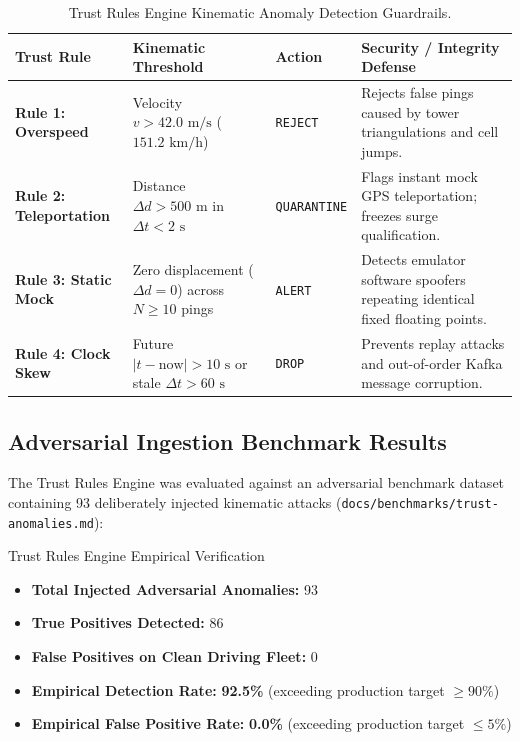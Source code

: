 \documentclass[11pt,a4paper]{article}
\begin{document}
\begin{table}[htbp]
\centering
\small
\begin{tabularx}{\textwidth}{l p{4.0cm} l X}
\toprule
\textbf{Trust Rule} & \textbf{Kinematic Threshold} & \textbf{Action} & \textbf{Security / Integrity Defense} \\
\midrule
\textbf{Rule 1: Overspeed} & Velocity $v > 42.0\text{ m/s}$ ($151.2\text{ km/h}$) & \texttt{REJECT} & Rejects false pings caused by tower triangulations and cell jumps. \\
\rowcolor{HexLightBg}
\textbf{Rule 2: Teleportation} & Distance $\Delta d > 500\text{ m}$ in $\Delta t < 2\text{ s}$ & \texttt{QUARANTINE} & Flags instant mock GPS teleportation; freezes surge qualification. \\
\textbf{Rule 3: Static Mock} & Zero displacement ($\Delta d = 0$) across $N \ge 10$ pings & \texttt{ALERT} & Detects emulator software spoofers repeating identical fixed floating points. \\
\rowcolor{HexLightBg}
\textbf{Rule 4: Clock Skew} & Future $|t - \text{now}| > 10\text{ s}$ or stale $\Delta t > 60\text{ s}$ & \texttt{DROP} & Prevents replay attacks and out-of-order Kafka message corruption. \\
\bottomrule
\end{tabularx}
\caption{Trust Rules Engine Kinematic Anomaly Detection Guardrails.}
\label{tab:trust_rules}
\end{table}

\subsection{Adversarial Ingestion Benchmark Results}
The Trust Rules Engine was evaluated against an adversarial benchmark dataset containing 93 deliberately injected kinematic attacks (\texttt{docs/benchmarks/trust-anomalies.md}):
\begin{metricbox}{Trust Rules Engine Empirical Verification}
\begin{itemize}[leftmargin=1.5em]
    \item \textbf{Total Injected Adversarial Anomalies:} 93
    \item \textbf{True Positives Detected:} 86
    \item \textbf{False Positives on Clean Driving Fleet:} 0
    \item \textbf{Empirical Detection Rate:} \textbf{92.5\%} (exceeding production target $\ge 90\%$)
    \item \textbf{Empirical False Positive Rate:} \textbf{0.0\%} (exceeding production target $\le 5\%$)
\end{itemize}
\end{metricbox}
\end{document}

